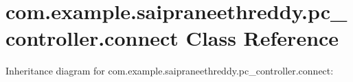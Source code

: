 \hypertarget{classcom_1_1example_1_1saipraneethreddy_1_1pc__controller_1_1connect}{}\section{com.\+example.\+saipraneethreddy.\+pc\+\_\+controller.\+connect Class Reference}
\label{classcom_1_1example_1_1saipraneethreddy_1_1pc__controller_1_1connect}


Inheritance diagram for com.\+example.\+saipraneethreddy.\+pc\+\_\+controller.\+connect\+:
